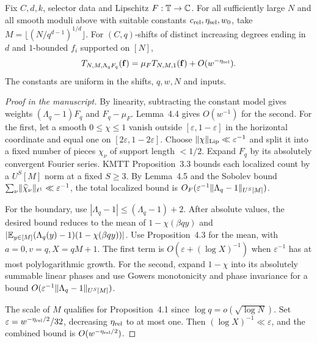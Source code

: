 \begin{theorem}\label{t:relative-selector-comparison}
\leanok
{}
Fix $C,d,k$, selector data and Lipschitz $F:\mathbb T\to\mathbb C$.
For all sufficiently large $N$ and all smooth moduli above
with suitable constants $c_{\rm rel},\eta_{\rm sel}, w_0$,
take $M=\lfloor(N/q^{d-1})^{1/d}\rfloor$.
For $(C,q)$-shifts of distinct increasing degrees ending in $d$
and $1$-bounded $f_i$ supported on $[N]$,
\[
 T_{N,M,\Lambda_qF_q}(\mathbf f)
 =\mu_F T_{N,M,1}(\mathbf f)+O(w^{-\eta_{\rm sel}}).
\]
The constants are uniform in the shifts, $q,w,N$ and inputs.
\end{theorem}
\begin{proof}[Proof in the manuscript]
\leanok
By linearity, subtracting the constant model gives weights
$(\Lambda_q-1)F_q$ and $F_q-\mu_F$. Lemma~4.4
gives $O(w^{-1})$ for the second. For the first, let a smooth
$0\le\chi\le1$ vanish outside $[\varepsilon,1-\varepsilon]$
in the horizontal coordinate and equal one on
$[2\varepsilon,1-2\varepsilon]$. Choose
$\lVert\chi\rVert_{\rm Lip}\ll\varepsilon^{-1}$ and split it into
a fixed number of pieces $\chi_\nu$ of support length $<1/2$.
Expand $F_q$ by its absolutely convergent Fourier series.
KMTT Proposition~3.3 bounds each localized count by a
$U^S[M]$ norm at a fixed $S\ge3$. By Lemma~4.5 and the
Sobolev bound $\sum_\nu\lVert\widehat\chi_\nu\rVert_{\ell^1}
\ll\varepsilon^{-1}$, the total localized bound is
$O_F(\varepsilon^{-1}\lVert\Lambda_q-1\rVert_{U^S[M]})$.

For the boundary, use $|\Lambda_q-1|\le(\Lambda_q-1)+2$.
After absolute values, the desired bound reduces to the mean
of $1-\chi(\beta qy)$ and
$|\mathbb E_{y\in[M]}(\Lambda_q(y)-1)(1-\chi(\beta qy))|$.
Use Proposition~4.3 for the mean, with $a=0,v=q,X=qM+1$.
The first term is $O(\varepsilon+(\log X)^{-1})$ when
$\varepsilon^{-1}$ has at most polylogarithmic growth.
For the second, expand $1-\chi$ into its absolutely
summable linear phases and use Gowers monotonicity and
phase invariance for a bound $O(\varepsilon^{-1}
\lVert\Lambda_q-1\rVert_{U^S[M]})$.

The scale of $M$ qualifies for Proposition~4.1 since
$\log q=o(\sqrt{\log N})$. Set
$\varepsilon=w^{-\eta_{\rm rel}/2}/32$, decreasing
$\eta_{\rm rel}$ to at most one. Then
$(\log X)^{-1}\ll\varepsilon$, and the combined bound
is $O(w^{-\eta_{\rm rel}/2})$.
\end{proof}

